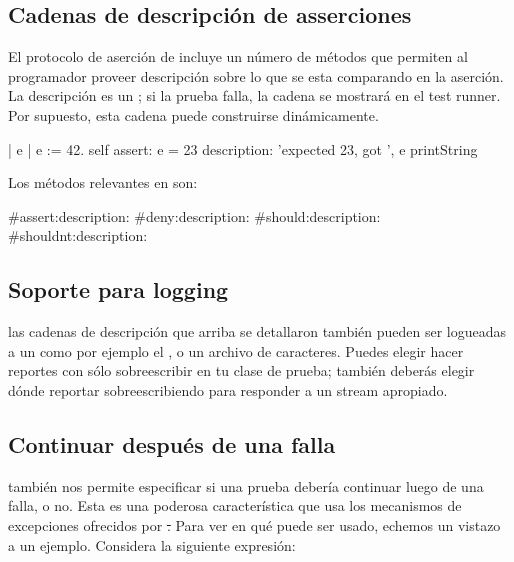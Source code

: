 \documentclass[a4paper,10pt,twoside]{book}
\begin{document}
\subsection{Cadenas de descripci\'on de asserciones}

El protocolo de aserci\'on de  incluye un n\'umero de m\'etodos que permiten
al programador proveer descripci\'on sobre lo que se esta comparando en la aserci\'on. La descripci\'on
es un ; si la prueba falla, la cadena se mostrar\'a en el test runner. Por supuesto, esta cadena
puede construirse din\'amicamente.

\begin{code}{}
| e |
e := 42.
self assert: e = 23
	description: 'expected 23, got ', e printString
\end{code}

Los  m\'etodos relevantes en  son:
\begin{code}{}
#assert:description:
#deny:description:
#should:description:
#shouldnt:description:
\end{code}

\subsection{Soporte para logging}
las cadenas de descripci\'on que arriba se detallaron tambi\'en pueden ser logueadas a un 
 como por ejemplo el , o un archivo de caracteres.
Puedes elegir hacer reportes con s\'olo sobreescribir  en tu clase de prueba; tambi\'en deber\'as elegir d\'onde reportar sobreescribiendo   para
responder a un stream apropiado.

\subsection{Continuar despu\'es de una falla}

\sunit tambi\'en nos permite especificar si una prueba deber\'ia continuar luego de una falla, o no. 
Esta es una poderosa caracter\'istica que usa los mecanismos de excepciones ofrecidos por \st.
Para ver en qu\'e puede ser usado, echemos un vistazo a un ejemplo. Considera la siguiente expresi\'on:
\end{document}
